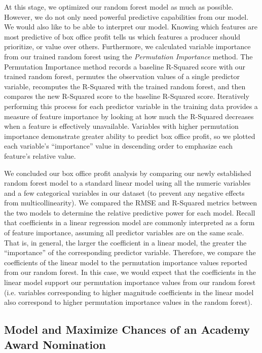\documentclass[10pt]{article}
\begin{document}
At this stage, we optimized our random forest model as much as possible. However, we do not only need powerful predictive capabilities from our model. We would also like to be able to interpret our model. Knowing which features are most predictive of box office profit tells us which features a producer should prioritize, or value over others. Furthermore, we calculated variable importance from our trained random forest using the \textit{Permutation Importance} method. The Permutation Importance method records a baseline R-Squared score with our trained random forest, permutes the observation values of a single predictor variable, recomputes the R-Squared with the trained random forest, and then compares the new R-Squared score to the baseline R-Squared score. Iteratively performing this process for each predictor variable in the training data provides a measure of feature importance by looking at how much the R-Squared decreases when a feature is effectively unavailable. Variables with higher permutation importance demonstrate greater ability to predict box office profit, so we plotted each variable’s “importance” value in descending order to emphasize each feature’s relative value.

We concluded our box office profit analysis by comparing our newly established random forest model to a standard linear model using all the numeric variables and a few categorical variables in our dataset (to prevent any negative effects from multicollinearity). We compared the RMSE and R-Squared metrics between the two models to determine the relative predictive power for each model. Recall that coefficients in a linear regression model are commonly interpreted as a form of feature importance, assuming all predictor variables are on the same scale. That is, in general, the larger the coefficient in a linear model, the greater the “importance” of the corresponding predictor variable. Therefore, we compare the coefficients of the linear model to the permutation importance values reported from our random forest. In this case, we would expect that the coefficients in the linear model support our permutation importance values from our random forest (i.e. variables corresponding to higher magnitude coefficients in the linear model also correspond to higher permutation importance values in the random forest).

\subsection{Model and Maximize Chances of an Academy Award Nomination}
\end{document}
